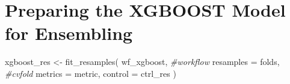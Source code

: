 \documentclass[
]{article}
\newenvironment{Shaded}{\begin{snugshade}}{\end{snugshade}}
\newcommand{\AttributeTok}[1]{\textcolor[rgb]{0.77,0.63,0.00}{#1}}
\newcommand{\CommentTok}[1]{\textcolor[rgb]{0.56,0.35,0.01}{\textit{#1}}}
\newcommand{\FunctionTok}[1]{\textcolor[rgb]{0.00,0.00,0.00}{#1}}
\newcommand{\NormalTok}[1]{#1}
\newcommand{\OtherTok}[1]{\textcolor[rgb]{0.56,0.35,0.01}{#1}}
\begin{document}
\hypertarget{preparing-the-xgboost-model-for-ensembling}{%
\section{Preparing the XGBOOST Model for
Ensembling}\label{preparing-the-xgboost-model-for-ensembling}}

\begin{Shaded}
\begin{Highlighting}[]
\NormalTok{xgboost\_res }\OtherTok{\textless{}{-}} 
  \FunctionTok{fit\_resamples}\NormalTok{(}
\NormalTok{    wf\_xgboost, }\CommentTok{\#workflow}
    \AttributeTok{resamples =}\NormalTok{ folds, }\CommentTok{\#cvfold}
    \AttributeTok{metrics =}\NormalTok{ metric,}
    \AttributeTok{control =}\NormalTok{ ctrl\_res}
\NormalTok{  )}
\end{Highlighting}
\end{Shaded}
\end{document}
